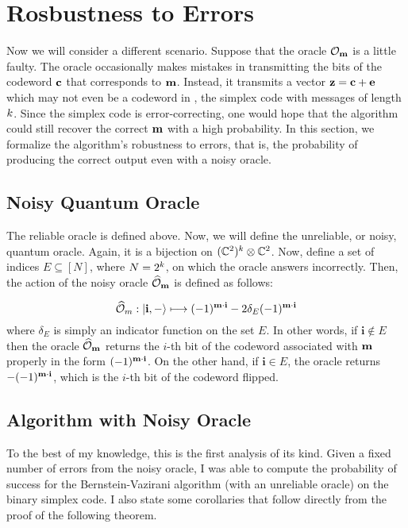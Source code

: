 \documentclass[12pt,twoside]{reedthesis}
\theoremstyle{definition}
\newcommand{\C}{\mathbb{C}}
\newcommand{\ket}[1]{\ensuremath{\lvert #1\rangle}\xspace}
\begin{document}
\section{Rosbustness to Errors}
Now we will consider a different scenario. Suppose that the oracle $\mathcal{O}_\mathbf{m}$ is a little faulty. The oracle occasionally makes mistakes in transmitting the bits of the codeword $\mathbf{c}$ that corresponds to $\mathbf{m}$. Instead, it transmits a vector $\mathbf{z} = \mathbf{c}+\mathbf{e}$ which may not even be a codeword in \simpl{\mlen}, the simplex code with messages of length $k$. Since the simplex code is error-correcting, one would hope that the algorithm could still recover the correct $\mathbf{m}$ with a high probability. In this section, we formalize the algorithm's robustness to errors, that is, the probability of producing the correct output even with a noisy oracle. 

\subsection{Noisy Quantum Oracle}
The reliable oracle is defined above. Now, we will define the unreliable, or noisy, quantum oracle. Again, it is a bijection on $(\C^2)^\mlen \otimes \C^2$. Now, define a set of indices $E \subseteq [N]$, where $N = 2^k$, on which the oracle answers incorrectly. Then, the action of the noisy oracle $\widehat{\mathcal{O}}_\mathbf{m}$ is defined as follows:

\begin{equation*}
\widehat{\mathcal{O}}_m: \ket{\mathbf{i}, -} \longmapsto (-1)^{\mess \cdot \mathbf{i}} - 2\delta_E (-1)^{\mess \cdot \mathbf{i}}
\end{equation*}
where $\delta_E$ is simply an indicator function on the set $E$. In other words, if $\mathbf{i} \notin E$ then the oracle $\widehat{\mathcal{O}}_\mathbf{m}$ returns the $i$-th bit of the codeword associated with $\mathbf{m}$ properly in the form $(-1)^{\mathbf{m} \cdot \mathbf{i}}$. On the other hand, if $\mathbf{i} \in E$, the oracle returns $-(-1)^{\mathbf{m}\cdot \mathbf{i}}$, which is the $i$-th bit of the codeword flipped.
\subsection{Algorithm with Noisy Oracle}

To the best of my knowledge, this is the first analysis of its kind. Given a fixed number of errors from the noisy oracle, I was able to compute the probability of success for the Bernstein-Vazirani algorithm (with an unreliable oracle) on the binary simplex code. I also state some corollaries that follow directly from the proof of the following theorem.
\end{document}
